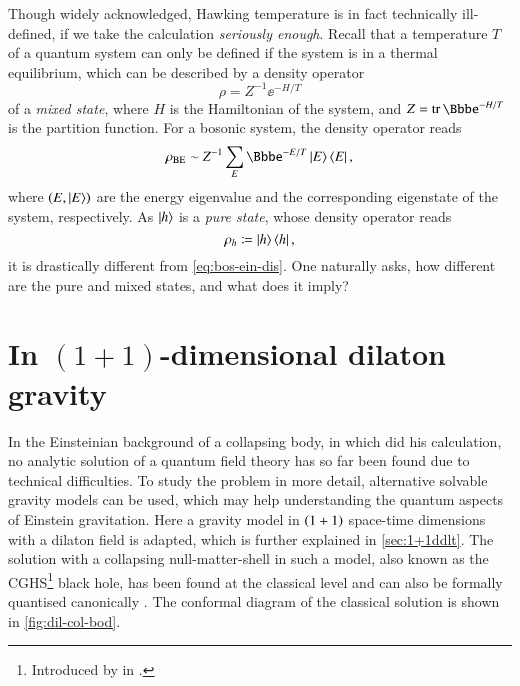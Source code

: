 Though widely acknowledged, Hawking temperature is in fact technically 
ill-defined, if we take the calculation \emph{seriously enough}. Recall that a 
temperature $T$ of a quantum system can only be defined if the system is in a 
thermal equilibrium, which can be described by a density operator
\begin{equation}
	\rho = Z^{-1} \ee^{-H/T}
\end{equation}
of a \emph{mixed state}, where $H$ is the Hamiltonian of the system, and $Z = 
\tr\ee^{-H/T}$ is the partition function. For a bosonic system, the density 
operator reads
\begin{equation}
{\rho}_\text{BE} \sim Z^{-1} \sum_E \ee^{-E/T} \Ket{E}\Bra{E},
\label{eq:bos-ein-dis}
\end{equation}
where ${\left(E, \Ket{E}\right)}$ are the energy eigenvalue and the corresponding 
eigenstate of the system, respectively. As $\Ket{h}$ is a \emph{pure state}, 
whose density operator reads
\begin{equation}
\rho_h \coloneqq \Ket{h}\Bra{h},
\label{eq:haw-den-optr}
\end{equation}
it is drastically different from \cref{eq:bos-ein-dis}. One naturally asks, how 
different are the pure and mixed states, and what does it imply?

\section{In $(1+1)$-dimensional dilaton gravity}
\label{sec:hawrad-1+1dila}

In the Einsteinian background of a collapsing body, in which 
\citeauthor{HAWKING1974} did his calculation, no analytic solution of a quantum 
field theory has so far been found due to technical difficulties. To study the 
problem in more detail, alternative solvable gravity models can be used, which 
may help understanding the quantum aspects of Einstein gravitation. Here a 
gravity model in ${\left(1+1\right)}$ space-time dimensions with a dilaton field is 
adapted, which is further explained in \cref{sec:1+1ddlt}. The solution with a 
collapsing null-matter-shell in such a model, also known as the 
CGHS\footnote{Introduced by \citeauthor{Callan1992} in \cite{Callan1992}.} black 
hole, has been found at the classical level and can also be formally quantised 
canonically \cite{Callan1992,Demers1996}. The conformal diagram of the classical 
solution is shown in \cref{fig:dil-col-bod}.

